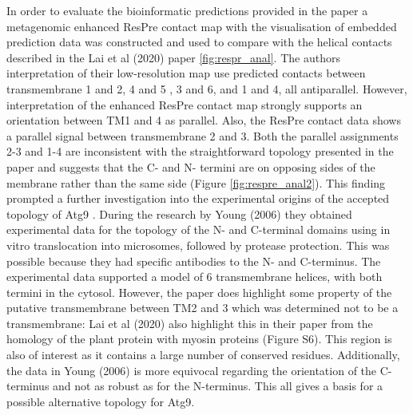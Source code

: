 In order to evaluate the bioinformatic predictions provided in the paper a metagenomic enhanced ResPre contact map with the visualisation of embedded prediction data was constructed and used to compare with the helical contacts described in the Lai et al (2020) paper \ref{fig:respr_anal}.  The authors interpretation of their low-resolution map use predicted contacts between transmembrane 1 and 2, 4 and 5 , 3 and 6, and 1 and 4, all antiparallel. However, interpretation of the enhanced ResPre contact map strongly supports an orientation between TM1 and 4 as parallel. Also, the ResPre contact data shows a parallel signal between transmembrane 2 and 3. Both the parallel assignments 2-3 and 1-4 are inconsistent with the straightforward topology presented in the paper and suggests that the C- and N- termini are on opposing sides of the membrane rather than the same side (Figure \ref{fig:respre_anal2}).  This finding prompted a further investigation into the experimental origins of the accepted topology of Atg9 \cite{Young2006}. During the research by Young (2006) they obtained experimental data for the topology of the N- and C-terminal domains using in vitro translocation into microsomes, followed by protease protection. This was possible because they had specific antibodies to the N- and C-terminus. The experimental data supported a model of 6 transmembrane helices, with both termini in the cytosol.  However, the paper does highlight some property of the putative transmembrane between TM2 and 3 which was determined not to be a transmembrane:  Lai et al (2020) also highlight this in their paper from the homology of the plant protein with myosin proteins (Figure S6). This region is also of interest as it contains a large number of conserved residues. Additionally, the data in Young (2006) is more equivocal regarding the orientation of the C-terminus and not as robust as for the N-terminus. This all gives a basis for a possible alternative topology for Atg9.

